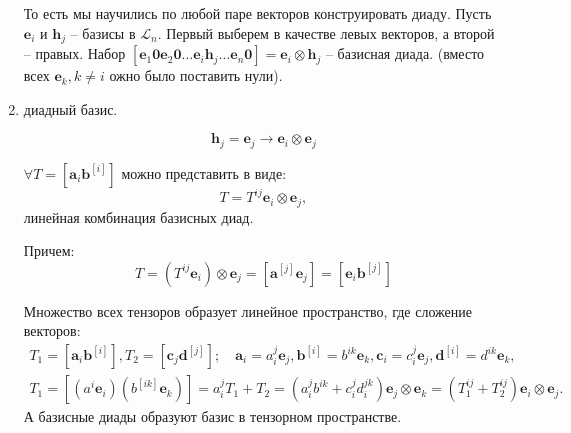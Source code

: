 \begin{definition}
\begin{enumerate}
    То есть мы научились по любой паре векторов конструировать диаду. Пусть $\mathbf{e}_i$ и
    $\mathbf{h}_j$ -- базисы в $\mathcal{L}_n$. Первый выберем в качестве левых векторов, а
    второй -- правых. Набор $[\mathbf{e}_1 \mathbf{0} \mathbf{e}_2 \mathbf{0} \dots \mathbf{e}_i \mathbf{h}_j \dots \mathbf{e}_n \mathbf{0}] = \mathbf{e}_i \otimes \mathbf{h}_j$ -- базисная диада. (вместо всех $\mathbf{e}_k, k\neq i$ ожно было поставить нули). 

  \item диадный базис. %
  
  	\begin{equation*}
  		\mathbf{h}_j = \mathbf{e}_j \longrightarrow \mathbf{e}_i \otimes \mathbf{e}_j
  	\end{equation*}
  
    \begin{theorem}
      $\forall T = [\mathbf{a}_i \mathbf{b}^{[i]}]$ можно представить в виде: 
      \begin{equation}\label{lec_2:eq:tensor_basis}
        T = T^{ij} \mathbf{e}_i \otimes \mathbf{e}_j,
      \end{equation}
      линейная комбинация базисных диад.

      Причем:
      \[
        T = (T^{ij} \mathbf{e}_i) \otimes \mathbf{e}_j
        = [\mathbf{a}^{[j]} \mathbf{e}_j]
        = [\mathbf{e}_i \mathbf{b}^{[j]}]
      \]
    \end{theorem}
    \begin{theorem}[Следствие]
      Множество всех тензоров образует линейное пространство, где сложение векторов:
      \begin{multline*}
        T_1 = [\mathbf{a}_i \mathbf{b}^{[i]}],
        T_2 = [\mathbf{c}_j \mathbf{d}^{[j]}]; \quad
        \mathbf{a}_i = a^j_i \mathbf{e}_j,
        \mathbf{b}^{[i]} = b^{ik} \mathbf{e}_k,
        \mathbf{c}_i = c^{j}_{i} \mathbf{e}_j, 
        \mathbf{d}^{[i]} = d^{ik} \mathbf{e}_k, \quad \\
        T_1 = [(a^i \mathbf{e}_i) (b^{[ik]} \mathbf{e}_k)] = a^j_i 
        T_1 + T_2 = (a^j_i b^{ik} + c^{j}_i d^{jk}_i) \mathbf{e}_j \otimes \mathbf{e}_k
        = (T_1^{ij} + T_2^{ij}) \mathbf{e}_i \otimes \mathbf{e}_j.
      \end{multline*}
      А базисные диады образуют базис в тензорном пространстве.
    \end{theorem}
  \end{enumerate}
\end{definition}


